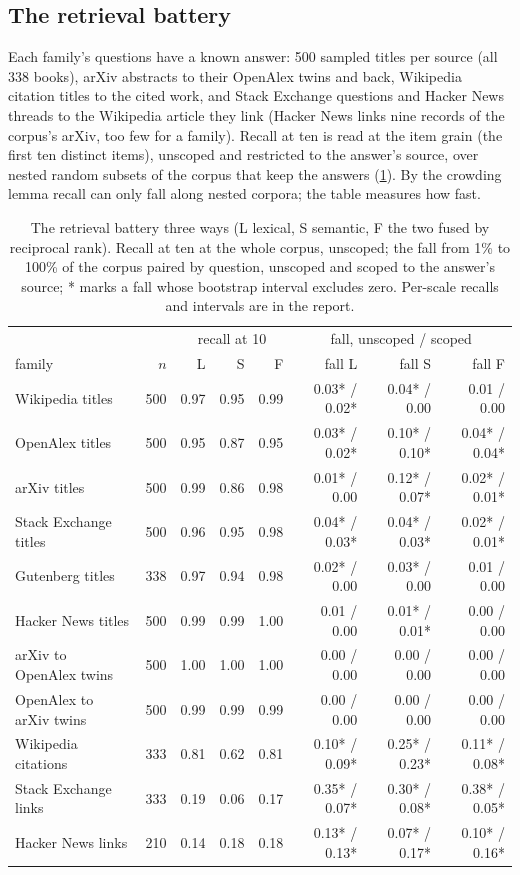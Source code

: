 \documentclass[11pt]{article}
\theoremstyle{plain}
\theoremstyle{definition}
\theoremstyle{remark}
\begin{document}
\subsection{The retrieval battery}
Each family's questions have a known answer: 500 sampled titles per source (all 338 books), arXiv
abstracts to their OpenAlex twins and back, Wikipedia citation titles to the cited work, and Stack
Exchange questions and Hacker News threads to the Wikipedia article they link (Hacker News links nine
records of the corpus's arXiv, too few for a family). Recall at ten is read at the item grain (the
first ten distinct items), unscoped and restricted to the answer's source, over nested random subsets
of the corpus that keep the answers (\cref{tab:battery}). By the crowding lemma recall can only fall
along nested corpora; the table measures how fast.

\begin{table}[ht]
\centering\footnotesize
\begin{tabular}{l r rrr rrr}
\toprule
 & & \multicolumn{3}{c}{recall at 10} & \multicolumn{3}{c}{fall, unscoped / scoped}\\
family & $n$ & L & S & F & fall L & fall S & fall F\\
\midrule
Wikipedia titles & 500 & 0.97 & 0.95 & 0.99 & 0.03* / 0.02* & 0.04* / 0.00 & 0.01 / 0.00\\
OpenAlex titles & 500 & 0.95 & 0.87 & 0.95 & 0.03* / 0.02* & 0.10* / 0.10* & 0.04* / 0.04*\\
arXiv titles & 500 & 0.99 & 0.86 & 0.98 & 0.01* / 0.00 & 0.12* / 0.07* & 0.02* / 0.01*\\
Stack Exchange titles & 500 & 0.96 & 0.95 & 0.98 & 0.04* / 0.03* & 0.04* / 0.03* & 0.02* / 0.01*\\
Gutenberg titles & 338 & 0.97 & 0.94 & 0.98 & 0.02* / 0.00 & 0.03* / 0.00 & 0.01 / 0.00\\
Hacker News titles & 500 & 0.99 & 0.99 & 1.00 & 0.01 / 0.00 & 0.01* / 0.01* & 0.00 / 0.00\\
arXiv to OpenAlex twins & 500 & 1.00 & 1.00 & 1.00 & 0.00 / 0.00 & 0.00 / 0.00 & 0.00 / 0.00\\
OpenAlex to arXiv twins & 500 & 0.99 & 0.99 & 0.99 & 0.00 / 0.00 & 0.00 / 0.00 & 0.00 / 0.00\\
Wikipedia citations & 333 & 0.81 & 0.62 & 0.81 & 0.10* / 0.09* & 0.25* / 0.23* & 0.11* / 0.08*\\
Stack Exchange links & 333 & 0.19 & 0.06 & 0.17 & 0.35* / 0.07* & 0.30* / 0.08* & 0.38* / 0.05*\\
Hacker News links & 210 & 0.14 & 0.18 & 0.18 & 0.13* / 0.13* & 0.07* / 0.17* & 0.10* / 0.16*\\
\bottomrule
\end{tabular}
\caption{The retrieval battery three ways (L lexical, S semantic, F the two fused by reciprocal rank). Recall at ten at the whole corpus, unscoped; the fall from 1\% to 100\% of the corpus paired by question, unscoped and scoped to the answer's source; * marks a fall whose bootstrap interval excludes zero. Per-scale recalls and intervals are in the report.}
\label{tab:battery}
\end{table}
\end{document}
